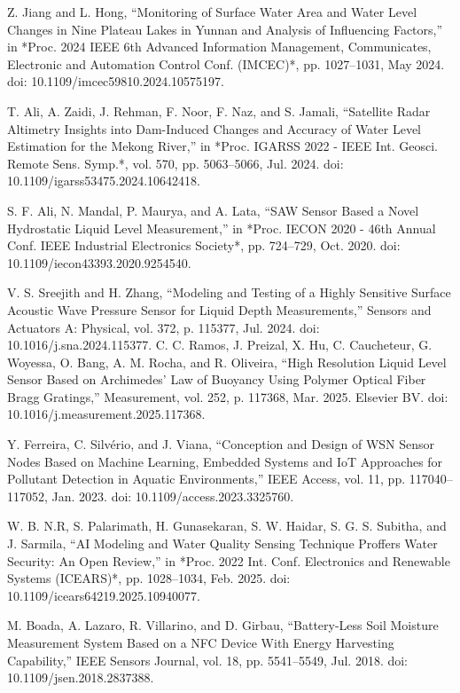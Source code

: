 \documentclass[conference]{IEEEtran}
\begin{document}
\begin{thebibliography}{00}
 Z. Jiang and L. Hong, 
``Monitoring of Surface Water Area and Water Level Changes in Nine Plateau Lakes in Yunnan and Analysis of Influencing Factors,'' 
in *Proc. 2024 IEEE 6th Advanced Information Management, Communicates, Electronic and Automation Control Conf. (IMCEC)*, 
pp. 1027--1031, May 2024. doi: 10.1109/imcec59810.2024.10575197.

 T. Ali, A. Zaidi, J. Rehman, F. Noor, F. Naz, and S. Jamali, 
``Satellite Radar Altimetry Insights into Dam-Induced Changes and Accuracy of Water Level Estimation for the Mekong River,'' 
in *Proc. IGARSS 2022 - IEEE Int. Geosci. Remote Sens. Symp.*, vol. 570, pp. 5063--5066, Jul. 2024. 
doi: 10.1109/igarss53475.2024.10642418.

 S. F. Ali, N. Mandal, P. Maurya, and A. Lata, 
``SAW Sensor Based a Novel Hydrostatic Liquid Level Measurement,'' 
in *Proc. IECON 2020 - 46th Annual Conf. IEEE Industrial Electronics Society*, pp. 724--729, Oct. 2020. 
doi: 10.1109/iecon43393.2020.9254540.

 V. S. Sreejith and H. Zhang, 
``Modeling and Testing of a Highly Sensitive Surface Acoustic Wave Pressure Sensor for Liquid Depth Measurements,'' 
Sensors and Actuators A: Physical, vol. 372, p. 115377, Jul. 2024. doi: 10.1016/j.sna.2024.115377.
 C. C. Ramos, J. Preizal, X. Hu, C. Caucheteur, G. Woyessa, O. Bang, A. M. Rocha, and R. Oliveira, 
``High Resolution Liquid Level Sensor Based on Archimedes’ Law of Buoyancy Using Polymer Optical Fiber Bragg Gratings,'' 
Measurement, vol. 252, p. 117368, Mar. 2025. Elsevier BV. doi: 10.1016/j.measurement.2025.117368.

 Y. Ferreira, C. Silvério, and J. Viana, 
``Conception and Design of WSN Sensor Nodes Based on Machine Learning, Embedded Systems and IoT Approaches for Pollutant Detection in Aquatic Environments,'' 
IEEE Access, vol. 11, pp. 117040--117052, Jan. 2023. doi: 10.1109/access.2023.3325760.

 W. B. N.R, S. Palarimath, H. Gunasekaran, S. W. Haidar, S. G. S. Subitha, and J. Sarmila, 
``AI Modeling and Water Quality Sensing Technique Proffers Water Security: An Open Review,'' 
in *Proc. 2022 Int. Conf. Electronics and Renewable Systems (ICEARS)*, pp. 1028--1034, Feb. 2025. doi: 10.1109/icears64219.2025.10940077.

 M. Boada, A. Lazaro, R. Villarino, and D. Girbau, 
``Battery-Less Soil Moisture Measurement System Based on a NFC Device With Energy Harvesting Capability,'' 
IEEE Sensors Journal, vol. 18, pp. 5541--5549, Jul. 2018. 
doi: 10.1109/jsen.2018.2837388.


\end{thebibliography}
\end{document}
